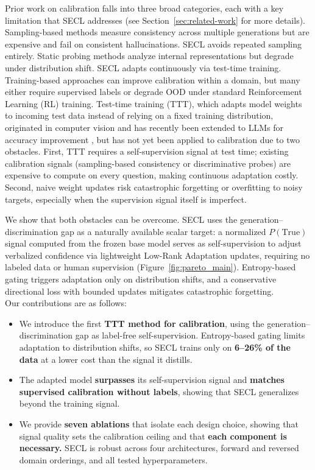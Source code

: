 \documentclass[11pt]{article}
\begin{document}
Prior work on calibration falls into three broad categories, each with a key limitation that SECL addresses (see Section~\ref{sec:related-work} for more details). Sampling-based methods \cite{manakul_selfcheckgpt_2023, kuhn_semantic_2023} measure consistency across multiple generations but are expensive and fail on consistent hallucinations. SECL avoids repeated sampling entirely. Static probing methods \cite{du_haloscope_2024, liu_litcab_2024} analyze internal representations but degrade under distribution shift. SECL adapts continuously via test-time training. Training-based approaches \cite{lin_teaching_2022, stangel_rewarding_2025, damani_binary_2025} can improve calibration within a domain, but many either require supervised labels or degrade OOD under standard Reinforcement Learning (RL) training.
Test-time training (TTT), which adapts model weights to incoming test data instead of relying on a fixed training distribution, originated in computer vision \cite{sun_testtime_2020, wang_tent_2021, wang_continual_2022} and has recently been extended to LLMs for accuracy improvement \cite{hardt_testtime_2024, hu_testtime_2025, sun_learning_2025, zweiger_selfadapting_2025}, but has not yet been applied to calibration due to two obstacles.
First, TTT requires a self-supervision signal at test time; existing calibration signals (sampling-based consistency or discriminative probes) are expensive to compute on every question, making continuous adaptation costly. Second, naive weight updates risk catastrophic forgetting or overfitting to noisy targets, especially when the supervision signal itself is imperfect.

We show that both obstacles can be overcome. SECL uses the generation--discrimination gap as a naturally available scalar target: a normalized $P(\text{True})$ signal computed from the frozen base model serves as self-supervision to adjust verbalized confidence via lightweight Low-Rank Adaptation \citep[LoRA;][]{hu_lora_2022} updates, requiring no labeled data or human supervision (Figure~\ref{fig:pareto_main}). Entropy-based gating triggers adaptation only on distribution shifts, and a conservative directional loss with bounded updates mitigates catastrophic forgetting.
\\Our contributions are as follows:
\begin{itemize}
    \item We introduce the first \textbf{TTT method for calibration}, using the generation--discrimination gap as label-free self-supervision. Entropy-based gating limits adaptation to distribution shifts, so SECL trains only on \textbf{6--26\% of the data} at a lower cost than the signal it distills.
    \item The adapted model \textbf{surpasses} its self-supervision signal and \textbf{matches supervised calibration without labels}, showing that SECL generalizes beyond the training signal.
    \item We provide \textbf{seven ablations} that isolate each design choice, showing that signal quality sets the calibration ceiling and that \textbf{each component is necessary.} SECL is robust across four architectures, forward and reversed domain orderings, and all tested hyperparameters.
\end{itemize}
\end{document}
